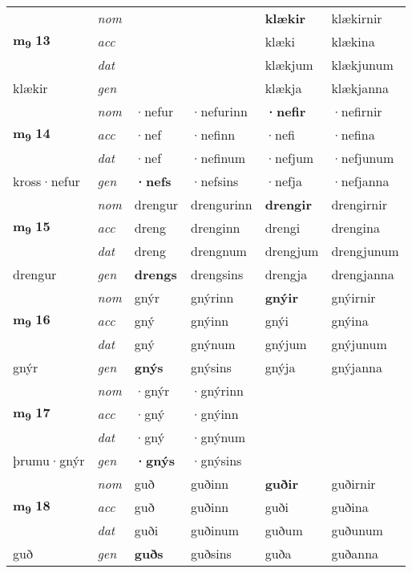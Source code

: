 \begin{longtable}[l]{X>{\footnotesize\itshape}XXXXX}
\multirow{3}{*}{{{\textbf{m{\textsubscript{9}}} \Large{\textbf{13}}}}} & nom &  &  & \textbf{klækir} & klækirnir \\*
 & acc &  &  & klæki & klækina \\*
 & dat &  &  & klækjum & klækjunum \\*
 {\footnotesize{klækir}} & gen & \textbf{} &  & klækja & klækjanna \\
\midrule

\multirow{3}{*}{{{\textbf{m{\textsubscript{9}}} \Large{\textbf{14}}}}} & nom & ·nefur & ·nefurinn & \textbf{·nefir} & ·nefirnir \\*
 & acc & ·nef & ·nefinn & ·nefi & ·nefina \\*
 & dat & ·nef & ·nefinum & ·nefjum & ·nefjunum \\*
 {\footnotesize{kross\allowbreak ·nefur}} & gen & \textbf{·nefs} & ·nefsins & ·nefja & ·nefjanna \\
\midrule

\multirow{3}{*}{{{\textbf{m{\textsubscript{9}}} \Large{\textbf{15}}}}} & nom & drengur & drengurinn & \textbf{drengir} & drengirnir \\*
 & acc & dreng & drenginn & drengi & drengina \\*
 & dat & dreng & drengnum & drengjum & drengjunum \\*
 {\footnotesize{drengur}} & gen & \textbf{drengs} & drengsins & drengja & drengjanna \\
\midrule

\multirow{3}{*}{{{\textbf{m{\textsubscript{9}}} \Large{\textbf{16}}}}} & nom & gnýr & gnýrinn & \textbf{gnýir} & gnýirnir \\*
 & acc & gný & gnýinn & gnýi & gnýina \\*
 & dat & gný & gnýnum & gnýjum & gnýjunum \\*
 {\footnotesize{gnýr}} & gen & \textbf{gnýs} & gnýsins & gnýja & gnýjanna \\
\midrule

\multirow{3}{*}{{{\textbf{m{\textsubscript{9}}} \Large{\textbf{17}}}}} & nom & ·gnýr & ·gnýrinn & \textbf{} &  \\*
 & acc & ·gný & ·gnýinn &  &  \\*
 & dat & ·gný & ·gnýnum &  &  \\*
 {\footnotesize{þrumu\allowbreak ·gnýr}} & gen & \textbf{·gnýs} & ·gnýsins &  &  \\
\midrule

\multirow{3}{*}{{{\textbf{m{\textsubscript{9}}} \Large{\textbf{18}}}}} & nom & guð & guðinn & \textbf{guðir} & guðirnir \\*
 & acc & guð & guðinn & guði & guðina \\*
 & dat & guði & guðinum & guðum & guðunum \\*
 {\footnotesize{guð}} & gen & \textbf{guðs} & guðsins & guða & guðanna \\
\midrule


\end{longtable}
